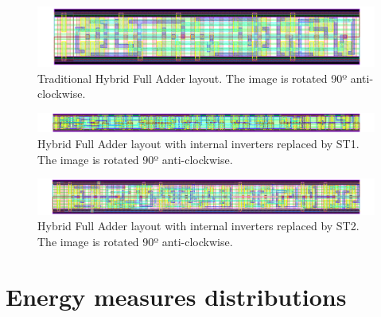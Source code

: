 \documentclass[diss,pgmicro,english]{iiufrgs}
\begin{document}
\newpage


\begin{figure}[]
\centering
\includegraphics[width=1.5\textwidth, angle =90]{HYBRID.png}
\caption{Traditional Hybrid Full Adder layout. The image is rotated 90º anti-clockwise.}
\label{fig:HYBRID}
\end{figure}

\newpage
\begin{figure}[]
\centering
\includegraphics[width=1.5\textwidth, angle =90]{HYBRIDST1.png}
\caption{Hybrid Full Adder layout with internal inverters replaced by ST1. The image is rotated 90º anti-clockwise.}
\label{fig:HYBRIDST1}
\end{figure}

\newpage
\begin{figure}[]
\centering
\includegraphics[width=1.5\textwidth, angle =90]{HYBRIDST2.png}
\caption{Hybrid Full Adder layout with internal inverters replaced by ST2. The image is rotated 90º anti-clockwise.}
\label{fig:HYBRIDST2}
\end{figure}


\chapter{Energy measures distributions}

\addtolength{\oddsidemargin}{-.875in}
\addtolength{\evensidemargin}{-.875in}
\addtolength{\textwidth}{1.75in}
\end{document}
